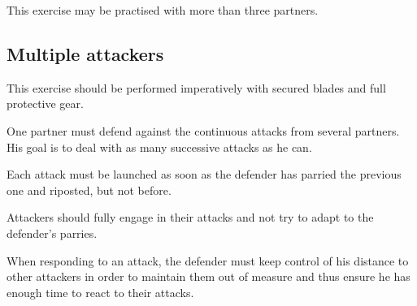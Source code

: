 This exercise may be practised with more than three partners.

\subsection{Multiple attackers}
This exercise should be performed imperatively with secured blades and full protective gear.

One partner must defend against the continuous attacks from several partners.
His goal is to deal with as many successive attacks as he can.

Each attack must be launched as soon as the defender has parried the previous one and riposted, but not before.

Attackers should fully engage in their attacks and not try to adapt to the defender's parries.

When responding to an attack, the defender must keep control of his distance to other attackers in order to maintain them out of measure and thus ensure he has enough time to react to their attacks.

